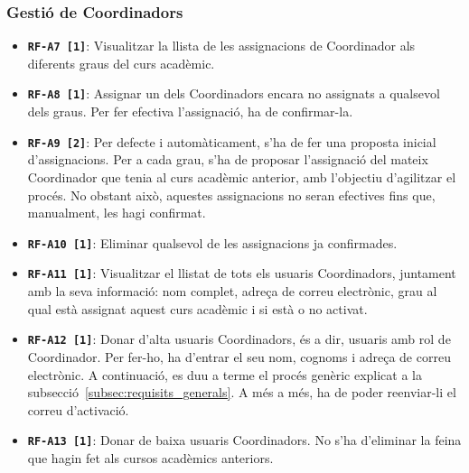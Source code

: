 \documentclass[a4paper,12pt]{ThesisStyle}
\begin{document}
\subsubsection{Gestió de Coordinadors}
\begin{itemize}
  \item \texttt{\textbf{RF-A7 [1]}}: Visualitzar la llista de les assignacions de Coordinador als diferents graus del curs acadèmic.
  \item \texttt{\textbf{RF-A8 [1]}}: Assignar un dels Coordinadors encara no assignats a qualsevol dels graus. Per fer efectiva l'assignació, ha de confirmar-la.
  \item \texttt{\textbf{RF-A9 [2]}}: Per defecte i automàticament, s'ha de fer una proposta inicial d'assignacions. Per a cada grau, s'ha de proposar l'assignació del mateix Coordinador que tenia al curs acadèmic anterior, amb l'objectiu d'agilitzar el procés. No obstant això, aquestes assignacions no seran efectives fins que, manualment, les hagi confirmat.
  \item \texttt{\textbf{RF-A10 [1]}}: Eliminar qualsevol de les assignacions ja confirmades.
  \item \texttt{\textbf{RF-A11 [1]}}: Visualitzar el llistat de tots els usuaris Coordinadors, juntament amb la seva informació: nom complet, adreça de correu electrònic, grau al qual està assignat aquest curs acadèmic i si està o no activat.
  \item \texttt{\textbf{RF-A12 [1]}}: Donar d'alta usuaris Coordinadors, és a dir, usuaris amb rol de Coordinador. Per fer-ho, ha d'entrar el seu nom, cognoms i adreça de correu electrònic. A continuació, es duu a terme el procés genèric explicat a la subsecció~\ref{subsec:requisits_generals}. A més a més, ha de poder reenviar-li el correu d'activació.
  \item \texttt{\textbf{RF-A13 [1]}}: Donar de baixa usuaris Coordinadors. No s'ha d'eliminar la feina que hagin fet als cursos acadèmics anteriors.
\end{itemize}
\end{document}

